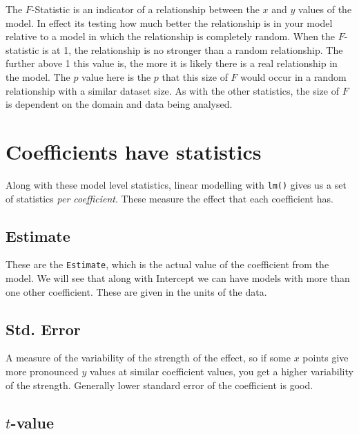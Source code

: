 \documentclass[]{book}
\begin{document}
The \(F\)-Statistic is an indicator of a relationship between the \(x\) and \(y\) values of the model. In effect its testing how much better the relationship is in your model relative to a model in which the relationship is completely random. When the \(F\)-statistic is at 1, the relationship is no stronger than a random relationship. The further above 1 this value is, the more it is likely there is a real relationship in the model. The \(p\) value here is the \(p\) that this size of \(F\) would occur in a random relationship with a similar dataset size. As with the other statistics, the size of \(F\) is dependent on the domain and data being analysed.

\hypertarget{coefficients-have-statistics}{%
\section{Coefficients have statistics}\label{coefficients-have-statistics}}

Along with these model level statistics, linear modelling with \texttt{lm()} gives us a set of statistics \emph{per coefficient}. These measure the effect that each coefficient has.

\hypertarget{estimate}{%
\subsection{Estimate}\label{estimate}}

These are the \texttt{Estimate}, which is the actual value of the coefficient from the model. We will see that along with Intercept we can have models with more than one other coefficient. These are given in the units of the data.

\hypertarget{std.-error}{%
\subsection{Std. Error}\label{std.-error}}

A measure of the variability of the strength of the effect, so if some \(x\) points give more pronounced \(y\) values at similar coefficient values, you get a higher variability of the strength. Generally lower standard error of the coefficient is good.

\hypertarget{t-value}{%
\subsection{\texorpdfstring{\(t\)-value}{t-value}}\label{t-value}}
\end{document}
